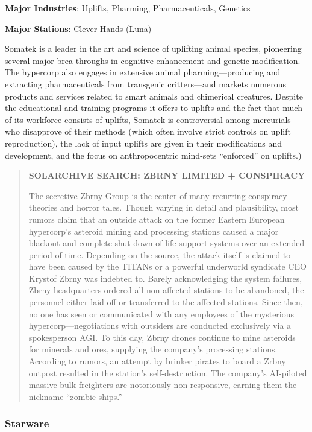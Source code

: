 \textbf{Major Industries}: Uplifts, Pharming, Pharmaceuticals, Genetics

\textbf{Major Stations}: Clever Hands (Luna)


Somatek is a leader in the art and science of uplifting animal
species, pioneering several major brea throughs in cognitive
enhancement and genetic modification. The hypercorp also engages in
extensive animal pharming—producing and extracting pharmaceuticals
from transgenic critters—and markets numerous products and services
related to smart animals and chimerical creatures. Despite the
educational and training programs it offers to uplifts and the fact
that much of its workforce consists of uplifts, Somatek is
controversial among mercurials who disapprove of their methods (which
often involve strict controls on uplift reproduction), the lack of
input uplifts are given in their modifications and development, and
the focus on anthropocentric mind-sets “enforced” on uplifts.)

\begin{quotation}
  \textbf{SOLARCHIVE SEARCH: ZBRNY LIMITED + CONSPIRACY}

  The secretive Zbrny Group is the center of many recurring conspiracy
  theories and horror tales. Though varying in detail and
  plausibility, most rumors claim that an outside attack on the former
  Eastern European hypercorp’s asteroid mining and processing stations
  caused a major blackout and complete shut-down of life support
  systems over an extended period of time. Depending on the source,
  the attack itself is claimed to have been caused by the TITANs or a
  powerful underworld syndicate CEO Krystof Zbrny was indebted
  to. Barely acknowledging the system failures, Zbrny headquarters
  ordered all non-affected stations to be abandoned, the personnel
  either laid off or transferred to the affected stations. Since then,
  no one has seen or communicated with any employees of the mysterious
  hypercorp—negotiations with outsiders are conducted exclusively via
  a spokesperson AGI. To this day, Zbrny drones continue to mine
  asteroids for minerals and ores, supplying the company’s processing
  stations. According to rumors, an attempt by brinker pirates to
  board a Zrbny outpost resulted in the station’s
  self-destruction. The company’s AI-piloted massive bulk freighters
  are notoriously non-responsive, earning them the nickname “zombie
  ships.”
\end{quotation}

\subsubsection{Starware}
\label{sec:starware}


